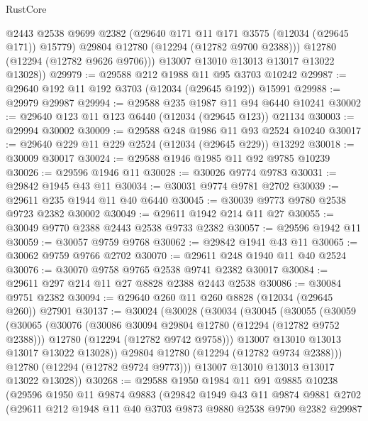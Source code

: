 \begin{lexlean}{RustCore}
\begin{coremodule}
            @2443
            @2538
            @9699
            @2382
            (@29640 @171 @11 @171 @3575 (@12034 (@29645 @171)) @15779)
            @29804
            @12780
            (@12294 (@12782 @9700 @2388)))
          @12780
          (@12294 (@12782 @9626 @9706)))
        @13007
        @13010
        @13013
        @13017
        @13022
        @13028))
@29979 := @29588 @212 @1988 @11 @95 @3703 @10242
@29987 := @29640 @192 @11 @192 @3703 (@12034 (@29645 @192)) @15991
@29988 := @29979 @29987
@29994 := @29588 @235 @1987 @11 @94 @6440 @10241
@30002 := @29640 @123 @11 @123 @6440 (@12034 (@29645 @123)) @21134
@30003 := @29994 @30002
@30009 := @29588 @248 @1986 @11 @93 @2524 @10240
@30017 := @29640 @229 @11 @229 @2524 (@12034 (@29645 @229)) @13292
@30018 := @30009 @30017
@30024 := @29588 @1946 @1985 @11 @92 @9785 @10239
@30026 := @29596 @1946 @11
@30028 := @30026 @9774 @9783
@30031 := @29842 @1945 @43 @11
@30034 := @30031 @9774 @9781 @2702
@30039 := @29611 @235 @1944 @11 @40 @6440
@30045 := @30039 @9773 @9780 @2538 @9723 @2382 @30002
@30049 := @29611 @1942 @214 @11 @27
@30055 := @30049 @9770 @2388 @2443 @2538 @9733 @2382
@30057 := @29596 @1942 @11
@30059 := @30057 @9759 @9768
@30062 := @29842 @1941 @43 @11
@30065 := @30062 @9759 @9766 @2702
@30070 := @29611 @248 @1940 @11 @40 @2524
@30076 := @30070 @9758 @9765 @2538 @9741 @2382 @30017
@30084 := @29611 @297 @214 @11 @27 @8828 @2388 @2443 @2538
@30086 := @30084 @9751 @2382
@30094 := @29640 @260 @11 @260 @8828 (@12034 (@29645 @260)) @27901
@30137 := @30024
    (@30028
      (@30034
        (@30045
          (@30055
            (@30059
              (@30065
                (@30076
                  (@30086 @30094 @29804 @12780 (@12294 (@12782 @9752 @2388)))
                  @12780
                  (@12294 (@12782 @9742 @9758)))
                @13007
                @13010
                @13013
                @13017
                @13022
                @13028))
            @29804
            @12780
            (@12294 (@12782 @9734 @2388)))
          @12780
          (@12294 (@12782 @9724 @9773)))
        @13007
        @13010
        @13013
        @13017
        @13022
        @13028))
@30268 := @29588
    @1950
    @1984
    @11
    @91
    @9885
    @10238
    (@29596
      @1950
      @11
      @9874
      @9883
      (@29842
        @1949
        @43
        @11
        @9874
        @9881
        @2702
        (@29611
          @212
          @1948
          @11
          @40
          @3703
          @9873
          @9880
          @2538
          @9790
          @2382
          @29987

\end{coremodule}
\end{lexlean}
